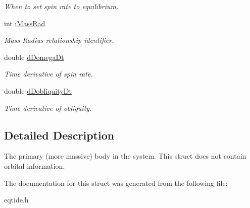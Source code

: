 \begin{DoxyCompactItemize}
\begin{DoxyCompactList}\small\item\em When to set spin rate to equilibrium. \end{DoxyCompactList}\item 
\hypertarget{struct_p_r_i_m_a_r_y_a3a5b382ca516da77d68da9e0c37befdb}{}int \hyperlink{struct_p_r_i_m_a_r_y_a3a5b382ca516da77d68da9e0c37befdb}{i\+Mass\+Rad}\label{struct_p_r_i_m_a_r_y_a3a5b382ca516da77d68da9e0c37befdb}

\begin{DoxyCompactList}\small\item\em Mass-\/\+Radius relationship identifier. \end{DoxyCompactList}\item 
\hypertarget{struct_p_r_i_m_a_r_y_aab643628bd2fb617585f24dff74b919a}{}double \hyperlink{struct_p_r_i_m_a_r_y_aab643628bd2fb617585f24dff74b919a}{d\+Domega\+Dt}\label{struct_p_r_i_m_a_r_y_aab643628bd2fb617585f24dff74b919a}

\begin{DoxyCompactList}\small\item\em Time derivative of spin rate. \end{DoxyCompactList}\item 
\hypertarget{struct_p_r_i_m_a_r_y_a5d5e40dd9631cf54b0104731d2d661fb}{}double \hyperlink{struct_p_r_i_m_a_r_y_a5d5e40dd9631cf54b0104731d2d661fb}{d\+Dobliquity\+Dt}\label{struct_p_r_i_m_a_r_y_a5d5e40dd9631cf54b0104731d2d661fb}

\begin{DoxyCompactList}\small\item\em Time derivative of obliquity. \end{DoxyCompactList}\end{DoxyCompactItemize}


\subsection{Detailed Description}
The primary (more massive) body in the system. This struct does not contain orbital information. 

The documentation for this struct was generated from the following file\+:\begin{DoxyCompactItemize}
\item 
eqtide.\+h\end{DoxyCompactItemize}
